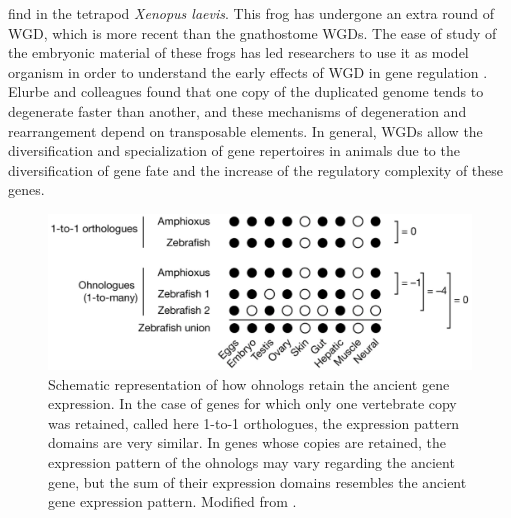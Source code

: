 find in the tetrapod \textit{Xenopus laevis}. This frog has undergone an extra round of WGD, which is more recent than the gnathostome WGDs. The ease of study of the embryonic material of these frogs has led researchers to use it as model organism in order to understand the early effects of WGD in gene regulation \parencite{elurbe_regulatory_2017}. Elurbe and colleagues found that one copy of the duplicated genome tends to degenerate faster than another, and these mechanisms of degeneration and rearrangement depend on transposable elements. In general, WGDs allow the diversification and specialization of gene repertoires in animals due to the diversification of gene fate and the increase of the regulatory complexity of these genes.


\begin{figure}[ht]
\centering
\includegraphics[width=1\textwidth]{Figures/Intro/Ohnologs_expression.png}
\caption[Ohnologs expression]{Schematic representation of how ohnologs retain the ancient gene expression. In the case of genes for which only one vertebrate copy was retained, called here 1-to-1 orthologues, the expression pattern domains are very similar. In genes whose copies are retained, the expression pattern of the ohnologs may vary regarding the ancient gene, but the sum of their expression domains resembles the ancient gene expression pattern. Modified from \parencite{marletaz_amphioxus_2018}.
}
\label{fig:Intro_ohnologs}
\end{figure} 


